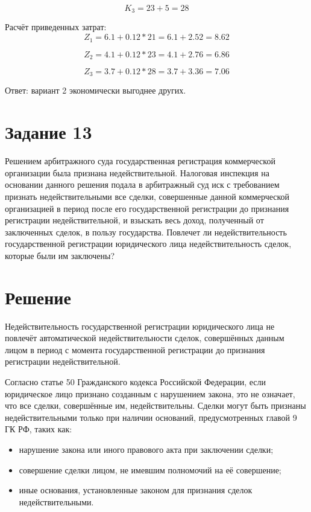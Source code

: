 \documentclass[14pt,a4paper]{extarticle}
\begin{document}
\[
K_3 = 23 + 5 = 28
\]

Расчёт приведенных затрат:
\[
Z_1=6.1+0.12*21=6.1+2.52=8.62
\]

\[
Z_2=4.1+0.12*23=4.1+2.76=6.86
\]

\[
Z_3=3.7+0.12*28=3.7+3.36=7.06
\]

Ответ: вариант 2 экономически выгоднее других.

\section{Задание 13}

Решением арбитражного суда государственная регистрация коммерческой организации
была признана недействительной. Налоговая инспекция на основании данного
решения подала в арбитражный суд иск с требованием признать недействительными
все сделки, совершенные данной коммерческой организацией в период после его
государственной регистрации до признания регистрации недействительной, и
взыскать весь доход, полученный от заключенных сделок, в пользу государства.
Повлечет ли недействительность государственной регистрации юридического лица
недействительность сделок, которые были им заключены?

\section*{Решение}

Недействительность государственной регистрации юридического лица не повлечёт
автоматической недействительности сделок, совершённых данным лицом в период с
момента государственной регистрации до признания регистрации недействительной.

Согласно статье 50 Гражданского кодекса Российской Федерации, если юридическое
лицо признано созданным с нарушением закона, это не означает, что все сделки,
совершённые им, недействительны. Сделки могут быть признаны недействительными
только при наличии оснований, предусмотренных главой 9 ГК РФ, таких как:

\begin{itemize}
    \item нарушение закона или иного правового акта при заключении сделки;
    \item совершение сделки лицом, не имевшим полномочий на её совершение;
    \item иные основания, установленные законом для признания сделок недействительными.
\end{itemize}
\end{document}

